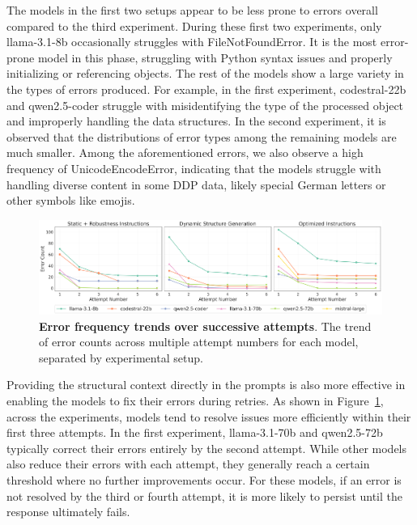 \documentclass{DESSThesis}
\begin{document}
The models in the first two setups appear to be less prone to errors overall compared to the third experiment. During these first two experiments, only llama-3.1-8b occasionally struggles with FileNotFoundError. It is the most error-prone model in this phase, struggling with Python syntax issues and properly initializing or referencing objects. The rest of the models show a large variety in the types of errors produced. For example, in the first experiment, codestral-22b and qwen2.5-coder struggle with misidentifying the type of the processed object and improperly handling the data structures. In the second experiment, it is observed that the distributions of error types among the remaining models are much smaller. Among the aforementioned errors, we also observe a high frequency of UnicodeEncodeError, indicating that the models struggle with handling diverse content in some DDP data, likely special German letters or other symbols like emojis.

\begin{figure}[!b]
    \centering
    \includegraphics[width=\linewidth]{img/Results/Second Experimental Phase/Error Trend Over Attempts.png}
    \caption[Error frequency trends over successive attempts]{\textbf{Error frequency trends over successive attempts}. The trend of error counts across multiple attempt numbers for each model, separated by experimental setup.}
    \label{fig:error_trends_second}
\end{figure}

Providing the structural context directly in the prompts is also more effective in enabling the models to fix their errors during retries. As shown in Figure~\ref{fig:error_trends_second}, across the experiments, models tend to resolve issues more efficiently within their first three attempts. In the first experiment, llama-3.1-70b and qwen2.5-72b typically correct their errors entirely by the second attempt. While other models also reduce their errors with each attempt, they generally reach a certain threshold where no further improvements occur. For these models, if an error is not resolved by the third or fourth attempt, it is more likely to persist until the response ultimately fails.
\end{document}
